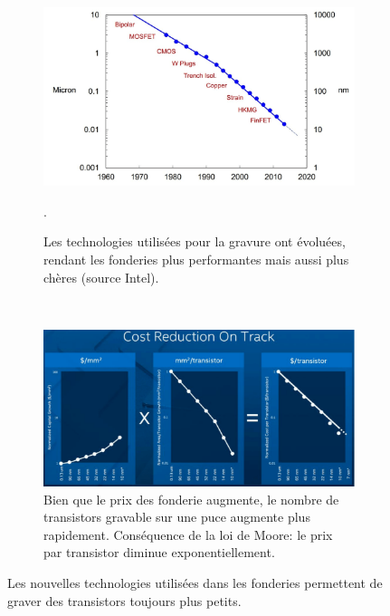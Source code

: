         
        \begin{figure}[htbp]
            \centering
            \begin{subfigure}[b]{0.40\linewidth}\centering
                \includegraphics[width=\linewidth]{images/processeurs_porte_fondeurs.png}
                \caption{\label{processeurs_porte_fondeurs} Les technologies utilisées pour la gravure ont évoluées, rendant les fonderies plus performantes mais aussi plus chères (source Intel).}.
            \end{subfigure}
            ~ %
            \begin{subfigure}[b]{0.50\linewidth}\centering
                \includegraphics[width=\linewidth]{images/processeurs_porte_moore.png}
                \caption{\label{pic_Moore_explique} Bien que le prix des fonderie augmente, le nombre de transistors gravable sur une puce augmente plus rapidement. Conséquence de la loi de Moore: le prix par transistor diminue exponentiellement.}
            \end{subfigure}
            \caption{Les nouvelles technologies utilisées dans les fonderies permettent de graver des transistors toujours plus petits.}\label{pic_fonderie}
        \end{figure}
 
